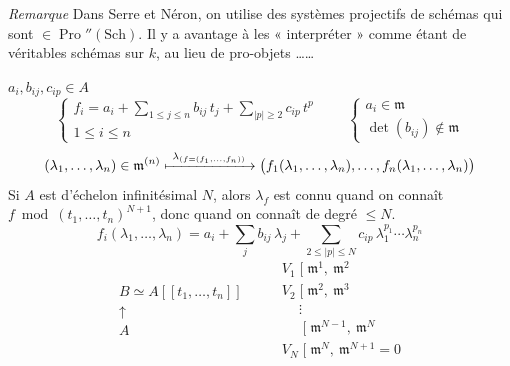 \documentclass[11pt,a4paper]{article}
\begin{document}
\emph{Remarque} Dans Serre et Néron, on utilise des  systèmes projectifs de schémas  qui sont $\in \operatorname{Pro}''(\mathrm{Sch})$.  Il y a avantage à les « interpréter » comme étant de véritables schémas sur $k$, \struck{\ill{}} au lieu de pro-objets ……

 \qquad $a_i, b_{ij}, c_{ip} \in A$
\[
  \begin{cases}
    f_i = a_i + \displaystyle\sum_{1 \leq j \leq n} b_{ij}\, t_j + \sum_{|p| \geq 2} c_{ip}\, t^p \\
    1 \leq i \leq n
  \end{cases}
  \qquad
  \begin{cases}
    a_i \in \mathfrak{m} \\
    \det(b_{ij}) \notin \mathfrak{m}
  \end{cases}
\]
\[
  (\lambda_1, \ldots, \lambda_n) \in \mathfrak{m}^{(n)} \xmapsto{\ \lambda_{(f = (f_1, \ldots, f_n))}\ } \bigl(f_1(\lambda_1, \ldots, \lambda_n), \ldots, f_n(\lambda_1, \ldots, \lambda_n)\bigr)
\]
Si $A$ est d'échelon infinitésimal $N$, alors $\lambda_f$ est connu quand on connaît $f \bmod (t_1, \ldots, t_n)^{N+1}$, donc quand on connaît    \ill{} de degré $\leq N$.
\[
  \boxed{\, f_i(\lambda_1, \ldots, \lambda_n) = a_i + \sum_j b_{ij}\, \lambda_j + \sum_{2 \leq |p| \leq N} c_{ip}\, \lambda_1^{p_1} \cdots \lambda_n^{p_n} \,}
\]
\[
  \begin{array}{c}
    B \simeq A[[t_1, \ldots, t_n]] \\
    \uparrow \\
    A
  \end{array}
  \qquad
  \begin{array}{l}
    V_1 \; [\; \mathfrak{m}^{1},\ \mathfrak{m}^2 \\
    V_2 \; [\; \mathfrak{m}^2,\ \mathfrak{m}^3 \\
    \quad\ \vdots \\
    \phantom{V_N} \; [\; \mathfrak{m}^{N-1},\ \mathfrak{m}^{N} \\
    V_N \; [\; \mathfrak{m}^{N},\ \mathfrak{m}^{N+1} = 0
  \end{array}
\]
\end{document}
